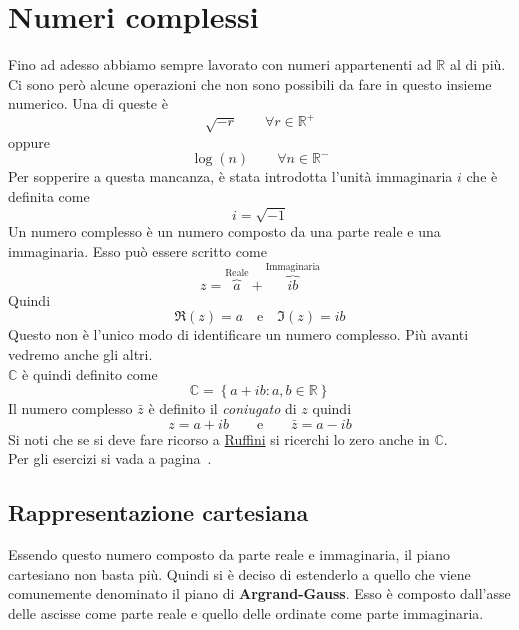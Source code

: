 
\section{Numeri complessi}\label{sec:complex}
Fino ad adesso abbiamo sempre lavorato con numeri appartenenti ad $\mathbb{R}$ al di più. Ci sono però
alcune operazioni che non sono possibili da fare in questo insieme numerico. Una di queste è
\begin{equation*}
\sqrt{-r}\qquad\forall r\in\mathbb{R}^+
\end{equation*}
oppure
\begin{equation*}
\log(n)\qquad \forall n\in\mathbb{R}^-
\end{equation*}
Per sopperire a questa mancanza, è stata introdotta l'unità immaginaria $i$ che è definita come
\begin{equation*}
i=\sqrt{-1}
\end{equation*}
Un numero complesso è un numero composto da una parte reale e una immaginaria. Esso può essere scritto
come
\begin{equation*}
z = \overbrace{a}^{\text{Reale}} + \overbrace{ib}^{\text{Immaginaria}}
\end{equation*}
Quindi
\begin{equation*}
\Re(z) = a \quad\text{e}\quad\Im(z)=ib
\end{equation*}
Questo non è l'unico modo di identificare un numero complesso. Più avanti vedremo anche gli altri.\\
$\mathbb{C}$ è quindi definito come
\begin{equation*}
\mathbb{C}=\left\{a+ib: a,b\in\mathbb{R}\right\}
\end{equation*}
Il numero complesso $\bar{z}$ è definito il \textit{coniugato} di $z$ quindi
\begin{equation*}
z=a+ib\qquad\text{e}\qquad\bar{z}=a-ib
\end{equation*}
Si noti che se si deve fare ricorso a \hyperref[ruffini]{Ruffini} si ricerchi lo zero anche in 
$\mathbb{C}$.\\
Per gli esercizi si vada a pagina~\pageref{ex:complex}.

\subsection{Rappresentazione cartesiana}\label{subsec:complex:cart}
Essendo questo numero composto da parte reale e immaginaria, il piano cartesiano non basta più. Quindi 
si è deciso di estenderlo a quello che viene comunemente denominato il piano di \textbf{Argrand-Gauss}.
Esso è composto dall'asse delle ascisse come parte reale e quello delle ordinate come parte 
immaginaria.

